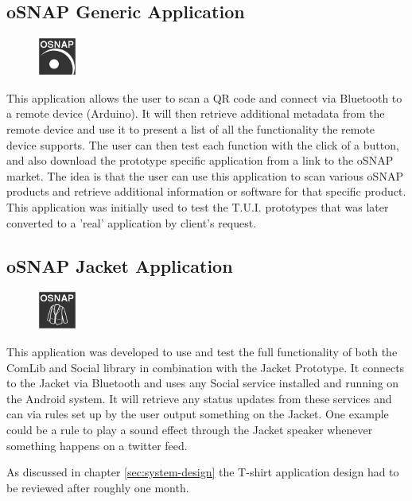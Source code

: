 \subsection{oSNAP Generic Application}
\begin{figure}
	\centering \includegraphics[scale=1]{img/app-generic}
\end{figure}
This application allows the user to scan a QR code and connect via Bluetooth to a remote device (Arduino).
It will then retrieve additional metadata from the remote device and use it to present a list of all the
functionality the remote device supports. The user can then test each function with the click of a button,
and also download the prototype specific application from a link to the oSNAP market.
The idea is that the user can use this application to scan various oSNAP products and retrieve
additional information or software for that specific product. This application was initially used to test
the T.U.I. prototypes that was later converted to a 'real' application by client's request.

\subsection{oSNAP Jacket Application} \label{section:app-jacket}
\begin{figure}
	\centering \includegraphics[scale=1]{img/app-jacket}
\end{figure}
This application was developed to use and test the full functionality of both the ComLib and Social library in combination with the
Jacket Prototype. It connects to the Jacket via Bluetooth and uses any Social service installed and running on the
Android system. It will retrieve any status updates from these services and can via rules set up by the user output something
on the Jacket. One example could be a rule to play a sound effect through the Jacket speaker whenever something happens
on a twitter feed.

As discussed in chapter \ref{sec:system-design} the T-shirt application design had to be reviewed after roughly one month.

